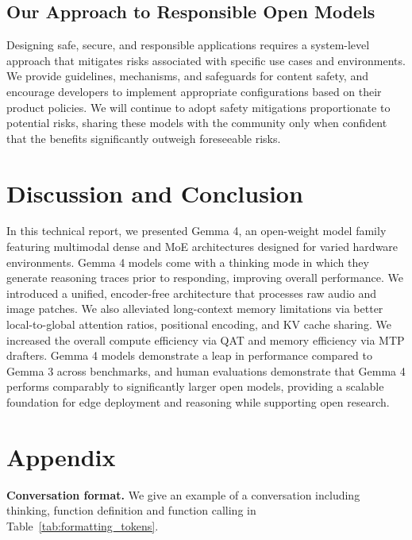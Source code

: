 \documentclass[11pt, a4paper, logo, twocolumn, copyright]{googledeepmind}
\begin{document}
\vspace{-20pt}
\subsection{Our Approach to Responsible Open Models}

Designing safe, secure, and responsible applications requires a system-level approach that mitigates risks associated with specific use cases and environments. We provide guidelines, mechanisms, and safeguards for content safety, and encourage developers to implement appropriate configurations based on their product policies. We will continue to adopt safety mitigations proportionate to potential risks, sharing these models with the community only when confident that the benefits significantly outweigh foreseeable risks.


\section{Discussion and Conclusion}

In this technical report, we presented Gemma 4, an open-weight model family featuring multimodal dense and MoE architectures designed for varied hardware environments. Gemma 4 models come with a thinking mode in which they generate reasoning traces prior to responding, improving overall performance. We introduced a unified, encoder-free architecture that processes raw audio and image patches. We also alleviated long-context memory limitations via better local-to-global attention ratios, positional encoding, and KV cache sharing. We increased the overall compute efficiency via QAT and memory efficiency via MTP drafters. Gemma 4 models demonstrate a leap in performance compared to Gemma 3 across benchmarks, and human evaluations demonstrate that Gemma 4 performs comparably to significantly larger open models, providing a scalable foundation for edge deployment and reasoning while supporting open research.










\onecolumn
\section*{Appendix}

\noindent \textbf{Conversation format.} We give an example of a conversation including thinking, function definition and function calling in Table~\ref{tab:formatting_tokens}.
\end{document}
